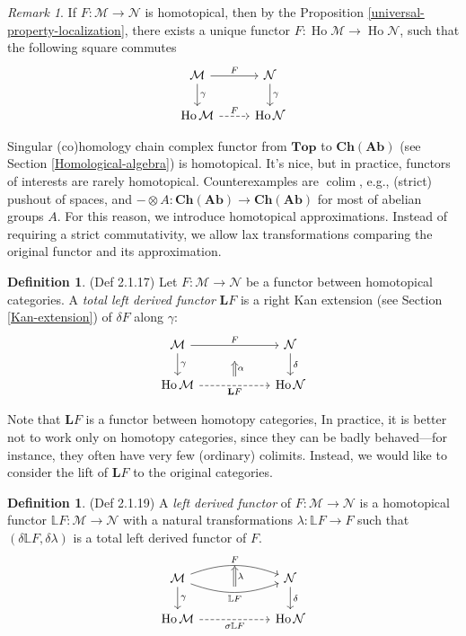 \documentclass[11pt]{article}
\theoremstyle{definition}
\newtheorem{definition}[theorem]{Definition}
\theoremstyle{remark}
\newtheorem{remark}[theorem]{Remark}
\newcommand{\Ho}{\operatorname{Ho}}
\newcommand{\colim}{\operatorname{colim}}
\newcommand{\Top}{\mathbf{Top}}
\newcommand{\ChAb}{\mathbf{Ch}(\mathbf{Ab})}
\newcommand{\calM}{\mathcal{M}}
\newcommand{\calN}{\mathcal{N}}
\newcommand{\bfL}{\mathbf{L}}
\newcommand{\bbL}{\mathbb{L}}
\begin{document}
\begin{remark}
    If $F : \calM \to \calN$ is homotopical, then by the Proposition \ref{universal-property-localization},
    there exists a unique functor $F : \Ho\calM \to \Ho\calN$,
    such that the following square commutes
    \[
    \begin{tikzcd}
        \calM \arrow[d, "\gamma"] \arrow[r, "F"] & \calN \arrow[d, "\gamma"]\\
        \Ho\calM \arrow[r, dashed, "F"] & \Ho\calN
    \end{tikzcd} 
    \]
\end{remark}

Singular (co)homology chain complex functor from $\Top$ to $\ChAb$
(see Section \ref{Homological-algebra}) is homotopical.
It's nice, but in practice, functors of interests are rarely homotopical.
Counterexamples are $\colim$, e.g., (strict) pushout of spaces, and $-\otimes A : \ChAb \to \ChAb $
for most of abelian groups $A$.
For this reason, we introduce homotopical approximations.
Instead of requiring a strict commutativity, we allow lax transformations
comparing the original functor and its approximation.

\begin{definition}(Def 2.1.17)
    Let $F : \calM \to \calN$ be a functor between homotopical categories.
    A \emph{total left derived functor} $\bfL F$ is a right Kan extension
    (see Section \ref{Kan-extension}) of $\delta F$ along
    $\gamma$:
    \[
    \begin{tikzcd}
    \calM \arrow[d,"\gamma"] \arrow[rr,"F"] 
    & {} 
    & \calN \arrow[d,"\delta"] \\
    \Ho\calM \arrow[rr,dashed,"\bfL F"'] 
    & {} \arrow[u,Rightarrow,"\alpha"',shorten <=6pt,shorten >=6pt]
    & \Ho\calN
    \end{tikzcd}
    \]
\end{definition}

Note that $\bfL F$ is a functor between homotopy categories,
In practice, it is better not to work only on homotopy categories,
since they can be badly behaved—for instance, they often have very few (ordinary) colimits.
Instead, we would like to consider the lift of $\bfL F$ to the original categories.

\begin{definition}(Def 2.1.19)
    A \emph{left derived functor} of $F : \calM \to \calN$ is a homotopical functor
    $\bbL F : \calM \to \calN$ with a natural transformations $\lambda : \bbL F \to F$
    such that $(\delta\bbL F, \delta\lambda)$ is a total left derived functor of $F$.
    \[
    \begin{tikzcd}
        \calM \arrow[d,"\gamma"]
            \arrow[rr,"F", bend left=20]{r}[name=UU]{}
            \arrow[rr,"\bbL F"', bend right=20]{r}[name=UD]{}
        &
        \arrow[Leftarrow, to path = (UU) -- (UD)\tikztonodes]{}{\lambda}
        & \calN \arrow[d,"\delta"] \\
        \Ho\calM \arrow[rr,dashed,"\sigma\bbL F"'] 
        & {}
        & \Ho\calN
    \end{tikzcd}
    \]
\end{definition}
\end{document}
